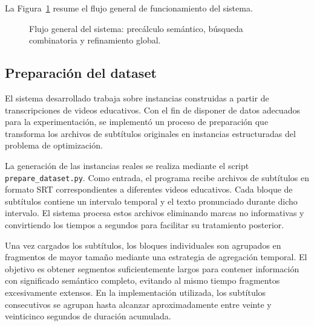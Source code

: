 \documentclass[12pt,a4paper]{article}
\begin{document}
La Figura~\ref{fig:pipeline} resume el flujo general de funcionamiento del sistema.

\begin{figure}[H]
\centering
{}
\caption{Flujo general del sistema: precálculo semántico, búsqueda combinatoria y refinamiento global.}
\label{fig:pipeline}
\end{figure}


\subsection{Preparación del dataset}

El sistema desarrollado trabaja sobre instancias construidas a partir de transcripciones de videos educativos. Con el fin de disponer de datos adecuados para la experimentación, se implementó un proceso de preparación que transforma los archivos de subtítulos originales en instancias estructuradas del problema de optimización.

La generación de las instancias reales se realiza mediante el script \linebreak \texttt{prepare\_dataset.py}. Como entrada, el programa recibe archivos de subtítulos en formato SRT correspondientes a diferentes videos educativos. Cada bloque de subtítulos contiene un intervalo temporal y el texto pronunciado durante dicho intervalo. El sistema procesa estos archivos eliminando marcas no informativas y convirtiendo los tiempos a segundos para facilitar su tratamiento posterior.

Una vez cargados los subtítulos, los bloques individuales son agrupados en fragmentos de mayor tamaño mediante una estrategia de agregación temporal. El objetivo es obtener segmentos suficientemente largos para contener información con significado semántico completo, evitando al mismo tiempo fragmentos excesivamente extensos. En la implementación utilizada, los subtítulos consecutivos se agrupan hasta alcanzar aproximadamente entre veinte y veinticinco segundos de duración acumulada.
\end{document}
